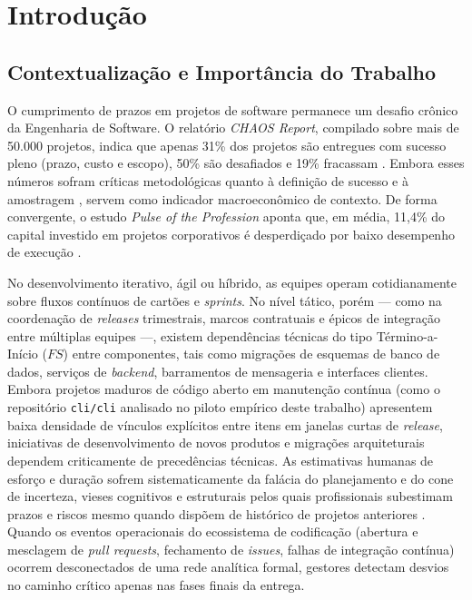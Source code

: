 \documentclass[12pt,openany,oneside,a4paper,english,brazilian,sumario=tradicional]{abntex2}
\begin{document}
\textual

\chapter{Introdução}\label{cap:introducao}

\section{Contextualização e Importância do Trabalho}\label{sec:contexto}

O cumprimento de prazos em projetos de software permanece um desafio crônico da Engenharia de Software. O relatório \textit{CHAOS Report}, compilado sobre mais de 50.000 projetos, indica que apenas 31\% dos projetos são entregues com sucesso pleno (prazo, custo e escopo), 50\% são desafiados e 19\% fracassam \cite{standish2020}. Embora esses números sofram críticas metodológicas quanto à definição de sucesso e à amostragem \cite{eveleens2010}, servem como indicador macroeconômico de contexto. De forma convergente, o estudo \textit{Pulse of the Profession} aponta que, em média, 11,4\% do capital investido em projetos corporativos é desperdiçado por baixo desempenho de execução \cite{pmi2020}.

No desenvolvimento iterativo, ágil ou híbrido, as equipes operam cotidianamente sobre fluxos contínuos de cartões e \textit{sprints}. No nível tático, porém — como na coordenação de \textit{releases} trimestrais, marcos contratuais e épicos de integração entre múltiplas equipes —, existem dependências técnicas do tipo Término-a-Início ($FS$) entre componentes, tais como migrações de esquemas de banco de dados, serviços de \textit{backend}, barramentos de mensageria e interfaces clientes. Embora projetos maduros de código aberto em manutenção contínua (como o repositório \texttt{cli/cli} analisado no piloto empírico deste trabalho) apresentem baixa densidade de vínculos explícitos entre itens em janelas curtas de \textit{release}, iniciativas de desenvolvimento de novos produtos e migrações arquiteturais dependem criticamente de precedências técnicas. As estimativas humanas de esforço e duração sofrem sistematicamente da falácia do planejamento e do cone de incerteza, vieses cognitivos e estruturais pelos quais profissionais subestimam prazos e riscos mesmo quando dispõem de histórico de projetos anteriores \cite{boehm1981,buehler1994,brooks1995,kahneman1979,jorgensen2004,mcconnell2006}. Quando os eventos operacionais do ecossistema de codificação (abertura e mesclagem de \textit{pull requests}, fechamento de \textit{issues}, falhas de integração contínua) ocorrem desconectados de uma rede analítica formal, gestores detectam desvios no caminho crítico apenas nas fases finais da entrega.
\end{document}
